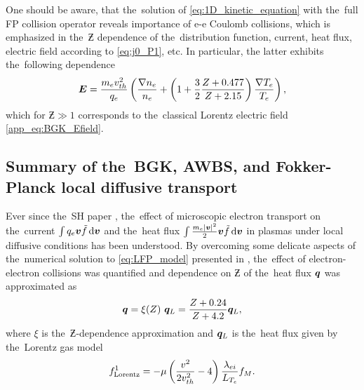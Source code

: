 One should be aware, that the~solution of \eqref{eq:1D_kinetic_equation}
with the~full FP collision operator reveals importance of
e-e Coulomb collisions, which is emphasized in the~$\Zbar$ dependence 
of the~distribution function, current, heat flux, 
electric field according to \eqref{eq:j0_P1}, etc.
In particular, the latter exhibits the~following dependence 
\cite{SpitzerHarm_PR1953}
\begin{equation}
  \boldsymbol{E} = \frac{m_e v_{th}^2}{q_e}
  \left(\frac{\nabla n_e}{n_e} + 
  \left(1 + \frac{3}{2}\frac{Z + 0.477}{Z + 2.15} \right)
  \frac{\nabla T_e}{T_e} \right),
  \label{eq:SH_Efield} 
\end{equation}
which for $\Zbar\gg1$ corresponds to the~classical Lorentz electric field 
\eqref{app_eq:BGK_Efield}.


\subsection{Summary of the~BGK, AWBS, and Fokker-Planck local diffusive 
transport}
\label{sec:SummaryDiffusiveKinetics}

Ever since the~SH paper \cite{SpitzerHarm_PR1953}, the~effect of microscopic
electron transport on the~current $\int q_e \boldsymbol{v} \tilde{f} \, \text{d}\boldsymbol{v}$ 
and the~heat flux $\int \frac{m_e |\boldsymbol{v}|^2}{2} \boldsymbol{v} \tilde{f} \, \text{d}\boldsymbol{v}$ 
in plasmas
under local diffusive conditions has been understood. By overcoming some 
delicate aspects of the~numerical solution to \eqref{eq:LFP_model} presented 
in \cite{CSR_1950}, the~effect of electron-electron collisions
was quantified and dependence on $\Zbar$ of the~heat flux
$\boldsymbol{q}$ was approximated as \cite{SpitzerHarm_PR1953} 
\begin{equation}
  \boldsymbol{q} = \xi(Z)~\boldsymbol{q}_L 
  = \frac{Z + 0.24}{Z + 4.2} \boldsymbol{q}_L ,
  \label{eq:qSH_approximation}
\end{equation}
where 
$\xi$ is the~$\Zbar$-dependence \cite{Epperlein_PoFB1991} approximation and
$\boldsymbol{q}_L$
is the~heat flux given 
by the~Lorentz gas model \cite{Lorentz_1905} 
\begin{equation}
  f^1_{\text{Lorentz}} = - \mu 
  \left( \frac{v^2}{2 v_{th}^2} - 4\right)
  \frac{\lambda_{ei}}{L_{T_e}}f_M
  . 
  \label{eq:Lorentz_approximation}
\end{equation}
 
